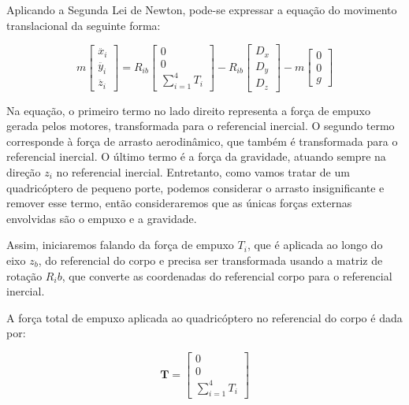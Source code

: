 Aplicando a Segunda Lei de Newton, pode-se expressar a equação do movimento translacional da seguinte forma:

\begin{equation}
m \begin{bmatrix}
\ddot{x_i} \\
\ddot{y_i} \\
\ddot{z_i}
\end{bmatrix} = R_{ib}
\begin{bmatrix}
0 \\
0 \\
\sum_{i=1}^{4} T_i
\end{bmatrix} - R_{ib}
\begin{bmatrix}
D_x \\
D_y \\
D_z
\end{bmatrix} - m
\begin{bmatrix}
0 \\
0 \\
g
\end{bmatrix}
\end{equation}

Na equação, o primeiro termo no lado direito representa a força de empuxo gerada pelos motores, transformada para o referencial inercial. O segundo termo corresponde à força de arrasto aerodinâmico, que também é transformada para o referencial inercial. O último termo é a força da gravidade, atuando sempre na direção $z_i$ no referencial inercial. Entretanto, como vamos tratar de um quadricóptero de pequeno porte, podemos considerar o arrasto insignificante e remover esse termo, então consideraremos que as únicas forças externas envolvidas são o empuxo e a gravidade.

Assim, iniciaremos falando da força de empuxo $T_i$, que é aplicada ao longo do eixo $z_b$, do referencial do corpo e precisa ser transformada usando a matriz de rotação $R_ib$, que converte as coordenadas do referencial corpo para o referencial inercial.

A força total de empuxo aplicada ao quadricóptero no referencial do corpo é dada por:

\begin{equation}
\mathbf{T} = \begin{bmatrix}
0 \\
0 \\
\sum_{i=1}^{4} T_i
\end{bmatrix}
\end{equation}

